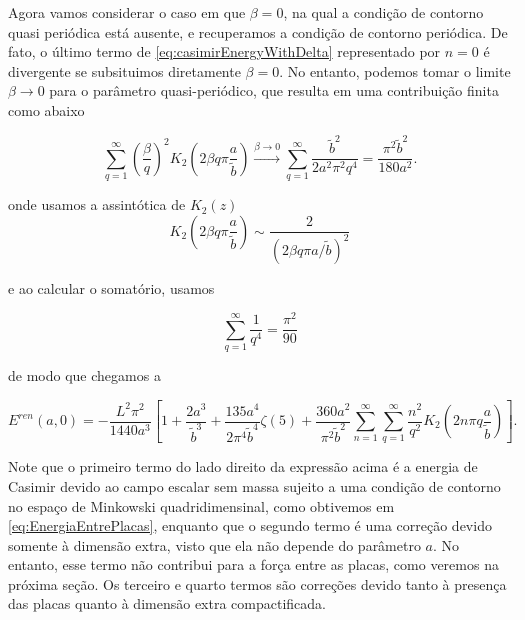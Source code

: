 Agora vamos considerar o caso em que $\beta=0$, na qual a condição de contorno quasi periódica está ausente, e recuperamos a condição de contorno periódica. De fato, o último termo de \eqref{eq:casimirEnergyWithDelta} representado por $n=0$ é divergente se subsituimos diretamente $\beta=0$. No entanto, podemos tomar o limite $\beta \to 0$ para o parâmetro quasi-periódico, que resulta em uma contribuição finita como abaixo

\begin{equation}
\sum_{q=1}^{\infty} \left( \frac{\beta}{q} \right)^{2} K_{2}\!\left( 2\beta q \pi \frac{a}{\tilde{b}} \right) \overset{\beta \to 0}{\longrightarrow}\sum_{q=1}^{\infty} \frac{\tilde{b}^{2}}{2a^{2}\pi^{2}q^{4}}=\frac{\pi^{2}\tilde{b}^{2}}{180a^{2}} . \label{eq:lastTermBetaToZero}
\end{equation}

onde usamos a assintótica de $K_2(z)$
\begin{equation}
    K_2 \left( 2\beta q \pi \frac{a}{\tilde{b}} \right) \sim \frac{2}{(2 \beta q \pi a/\tilde{b})^2}
\end{equation}

e ao calcular o somatório, usamos

\begin{equation}
    \sum_{q=1}^{\infty} \frac{1}{q^4} = \frac{\pi^2}{90}
\end{equation}

de modo que chegamos a

\begin{equation}
E^{ren}(a,0)=-\frac{L^2\pi^2}{1440a^3}\left[1+\frac{2a^3}{\tilde b^3}+\frac{135a^4}{2\pi^4\tilde b^4}\zeta(5)+\frac{360a^2}{\pi^2\tilde b^2}\sum_{n=1}^{\infty}\sum_{q=1}^{\infty}\frac{n^2}{q^2}K_2\!\left(2n\pi q\frac{a}{\tilde b}\right)\right].
\end{equation}

Note que o primeiro termo do lado direito da expressão acima é a energia de Casimir devido ao campo escalar sem massa sujeito a uma condição de contorno no espaço de Minkowski quadridimensinal, como obtivemos em \eqref{eq:EnergiaEntrePlacas}, enquanto que o segundo termo é uma correção devido somente à dimensão extra, visto que ela não depende do parâmetro $a$. No entanto, esse termo não contribui para a força entre as placas, como veremos na próxima seção. Os terceiro e quarto termos são correções devido tanto à presença das placas quanto à dimensão extra compactificada.

